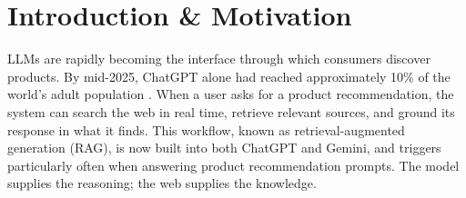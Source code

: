 
\chapter{Introduction \& Motivation}
\label{ch:introduction}


  LLMs are rapidly becoming the interface through which consumers discover products. By mid-2025, ChatGPT alone had reached approximately 10\% of the world's adult population \parencite{chatterji2025chatgpt}. When a user asks for a product recommendation, the system can search the web in real time, retrieve relevant sources, and ground its response in what it finds. This workflow, known as retrieval-augmented generation (RAG), is now built into both ChatGPT and Gemini, and triggers particularly often when answering product recommendation prompts. The model supplies the reasoning; the web supplies the knowledge.


